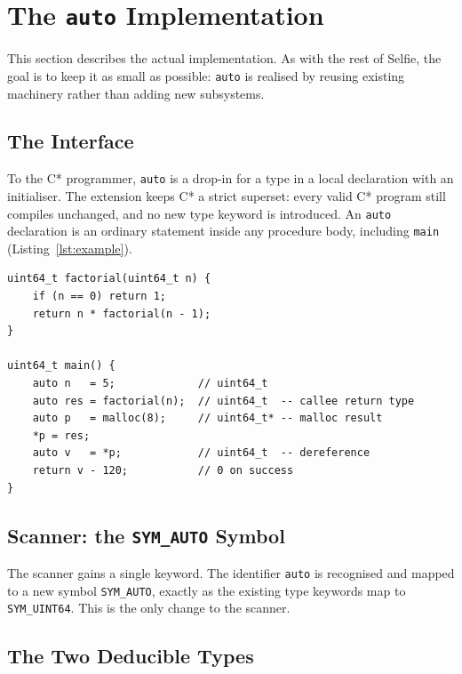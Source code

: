 \documentclass[a4paper,11pt]{article}
\begin{document}
\section{The \texttt{auto} Implementation}
\label{sec:implementation}

This section describes the actual implementation. As with the rest of Selfie, the goal is to keep it as small as possible: \texttt{auto} is realised by reusing existing machinery rather than adding new subsystems.

\subsection{The Interface}
\label{sec:interface}

To the C* programmer, \texttt{auto} is a drop-in for a type in a local declaration with an initialiser. The extension keeps C* a strict superset: every valid C* program still compiles unchanged, and no new type keyword is introduced. An \texttt{auto} declaration is an ordinary statement inside any procedure body, including \texttt{main} (Listing~\ref{lst:example}).

\begin{lstlisting}[caption={A complete program using \texttt{auto}}, label={lst:example}]
uint64_t factorial(uint64_t n) {
    if (n == 0) return 1;
    return n * factorial(n - 1);
}

uint64_t main() {
    auto n   = 5;             // uint64_t
    auto res = factorial(n);  // uint64_t  -- callee return type
    auto p   = malloc(8);     // uint64_t* -- malloc result
    *p = res;
    auto v   = *p;            // uint64_t  -- dereference
    return v - 120;           // 0 on success
}
\end{lstlisting}

\subsection{Scanner: the \texttt{SYM\_AUTO} Symbol}
\label{sec:scanner}

The scanner gains a single keyword. The identifier \texttt{auto} is recognised and mapped to a new symbol \texttt{SYM\_AUTO}, exactly as the existing type keywords map to \texttt{SYM\_UINT64}. This is the only change to the scanner.

\subsection{The Two Deducible Types}
\label{sec:types}
\end{document}
